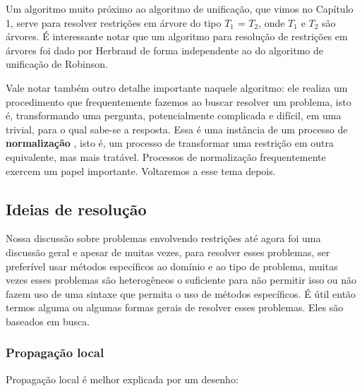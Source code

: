 \documentclass{article}
\theoremstyle{remark}
\theoremstyle{theorem}
\begin{document}
Um algoritmo muito próximo ao algoritmo de unificação, que vimos no Capítulo 1, serve para resolver restrições em árvore do tipo $T_1$ = $T_2$, onde $T_1$ e $T_2$ são árvores. É interessante notar que um algoritmo para resolução de restrições em árvores foi dado por Herbrand\cite{herbrand} de forma independente ao do algoritmo de unificação de Robinson.

Vale notar também outro detalhe importante naquele algoritmo: ele realiza um procedimento que frequentemente fazemos ao buscar resolver um problema, isto é, transformando uma pergunta, potencialmente complicada e difícil, em uma trivial, para o qual sabe-se a resposta. Essa é uma instância de um processo de \textbf{normalização} , isto é, um processo de transformar uma restrição em outra equivalente, mas mais tratável. Processos de normalização frequentemente
exercem um papel importante. Voltaremos a esse tema depois.

\subsection{Ideias de resolução}

Nossa discussão sobre problemas envolvendo restrições até agora foi uma discussão geral e apesar de muitas vezes, para resolver esses problemas, ser preferível usar métodos específicos ao domínio e ao tipo de problema, muitas vezes esses problemas são heterogêneos o suficiente para não permitir isso ou não fazem uso de uma sintaxe que permita o uso de métodos específicos.
É útil então termos alguma ou algumas formas gerais de resolver esses problemas. Eles são baseados em busca.

\subsubsection{Propagação local}

Propagação local é melhor explicada por um desenho:
\end{document}
